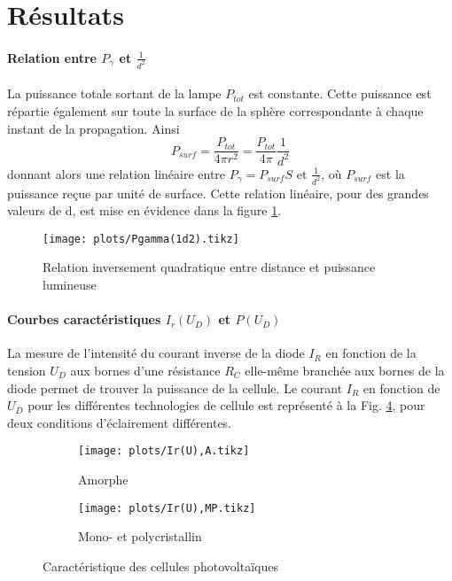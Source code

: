 \section{Résultats}

\paragraph*{Relation entre \(P_\gamma\) et \(\frac{1}{d^2}\)}
La puissance totale sortant de la lampe \(P_{tot}\) est constante. Cette puissance est répartie également sur toute la surface de la sphère correspondante à chaque instant de la propagation. Ainsi
\[P_{surf} = \frac{P_{tot}}{4 \pi r^2} = \frac{P_{tot}}{4 \pi} \frac{1}{d^2} \]
donnant alors une relation linéaire entre \(P_\gamma = P_{surf} S\) et \(\frac{1}{d^2}\), où \(P_{surf}\) est la puissance reçue par unité de surface.
Cette relation linéaire, pour des grandes valeurs de d, est mise en évidence dans la figure \ref{plot:1}.

\begin{figure}
    \centering
    \texttt{[image: plots/Pgamma(1d2).tikz]}
    \caption{Relation inversement quadratique entre distance et puissance lumineuse}
    \label{plot:1}
\end{figure}

\paragraph*{Courbes caractéristiques \(I_r(U_D)\) et \(P(U_D)\)}
La mesure de l'intensité du courant inverse de la diode \(I_R\) en fonction de la tension \(U_D\) aux bornes d'une résistance \(R_C\) elle-même branchée aux bornes de la diode permet de trouver la puissance de la cellule. Le courant \(I_R\) en fonction de \(U_D\) pour les différentes technologies de cellule est représenté à la Fig. \ref{plot:2}, pour deux conditions d'éclairement différentes.

\begin{figure}
    \centering
    \begin{subfigure}[c]{0.45\linewidth}
        \centering
        \texttt{[image: plots/Ir(U),A.tikz]}
        \caption{Amorphe}
        \label{plot:2a}
    \end{subfigure}
    \begin{subfigure}[c]{0.45\linewidth}
        \centering
        \texttt{[image: plots/Ir(U),MP.tikz]}
        \caption{Mono- et polycristallin}
        \label{plot:2b}
    \end{subfigure}
    \caption{Caractéristique des cellules photovoltaïques}
    \label{plot:2}
\end{figure}

